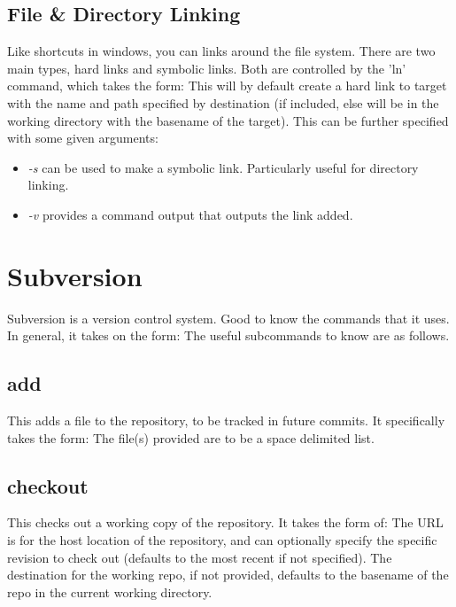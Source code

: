 \documentclass{article}
\begin{document}
\subsection{File \& Directory Linking}
Like shortcuts in windows, you can links around the file system. There are two main types, hard links and symbolic links. Both are controlled by the 'ln' command, which takes the form:
This will by default create a hard link to target with the name and path specified by destination (if included, else will be in the working directory with the basename of the target). This can be further specified with some given arguments:
\begin{itemize}
    \item \textit{-s} can be used to make a symbolic link. Particularly useful for directory linking.
    \item \textit{-v} provides a command output that outputs the link added.
\end{itemize}


\newpage

\section{Subversion}
Subversion is a version control system. Good to know the commands that it uses. In general, it takes on the form:
The useful subcommands to know are as follows.

\subsection{add}
This adds a file to the repository, to be tracked in future commits. It specifically takes the form:
The file(s) provided are to be a space delimited list.

\subsection{checkout}
This checks out a working copy of the repository. It takes the form of:
The URL is for the host location of the repository, and can optionally specify the specific revision to check out (defaults to the most recent if not specified). The destination for the working repo, if not provided, defaults to the basename of the repo in the current working directory.
\end{document}

